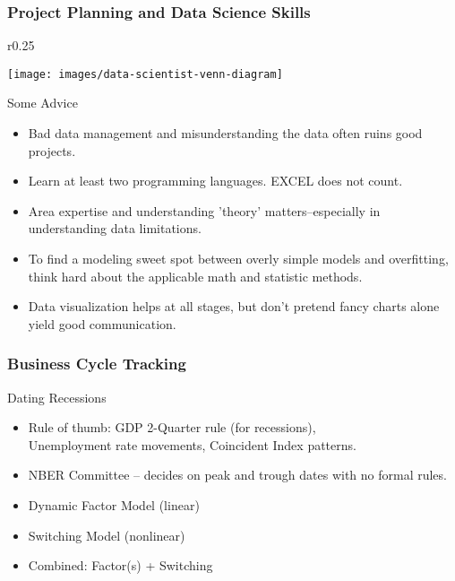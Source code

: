 \documentclass{beamer}
\begin{document}
\begin{frame}
\frametitle{Project Planning and Data Science Skills}

\begin{wrapfigure}{r}{0.25\linewidth}
	
		\texttt{[image: images/data-scientist-venn-diagram]}

\end{wrapfigure}


\medskip

Some Advice

{\small
\begin{itemize}
	\item 
	Bad data management and misunderstanding the data often ruins good projects.
	\item 
	Learn at least two programming languages. EXCEL does not count.
	\item 
	Area expertise and understanding 'theory' matters--especially in understanding data limitations. 
	\item
	To find a modeling sweet spot between overly simple models and overfitting, think hard about the applicable math and statistic methods. 
	\item 
	Data visualization helps at all stages, but don't pretend fancy charts alone yield good communication.   
\end{itemize}
}

\end{frame}


\begin{frame}
	\frametitle{Business Cycle Tracking}

{\large Dating Recessions}

\begin{itemize}
	\item Rule of thumb: GDP 2-Quarter rule (for recessions),\\ Unemployment rate movements, Coincident Index patterns. 
	\item NBER Committee -- decides on peak and trough dates with no formal rules.
	\item Dynamic Factor Model (linear)
	\item Switching Model (nonlinear)
	\item Combined: Factor(s) + Switching
\end{itemize}	

\end{frame}
\end{document}
